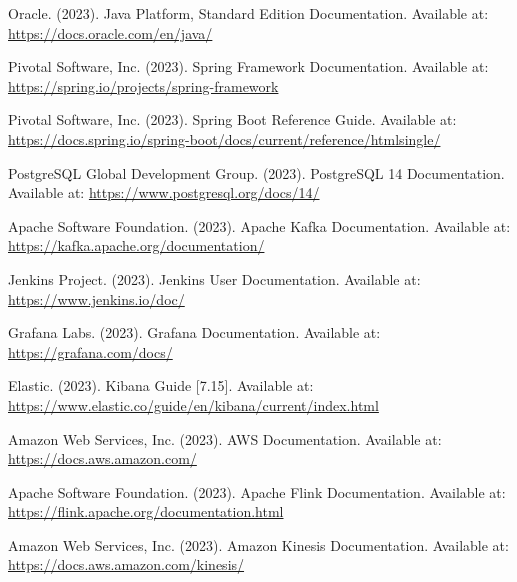 \documentclass[12pt,a4paper]{report}
\begin{document}
 
\begin{thebibliography}{9}
Oracle. (2023). Java Platform, Standard Edition Documentation. Available at: \url{https://docs.oracle.com/en/java/}

Pivotal Software, Inc. (2023). Spring Framework Documentation. Available at: \url{https://spring.io/projects/spring-framework}

Pivotal Software, Inc. (2023). Spring Boot Reference Guide. Available at: \url{https://docs.spring.io/spring-boot/docs/current/reference/htmlsingle/}

PostgreSQL Global Development Group. (2023). PostgreSQL 14 Documentation. Available at: \url{https://www.postgresql.org/docs/14/}

Apache Software Foundation. (2023). Apache Kafka Documentation. Available at: \url{https://kafka.apache.org/documentation/}

Jenkins Project. (2023). Jenkins User Documentation. Available at: \url{https://www.jenkins.io/doc/}

Grafana Labs. (2023). Grafana Documentation. Available at: \url{https://grafana.com/docs/}

Elastic. (2023). Kibana Guide [7.15]. Available at: \url{https://www.elastic.co/guide/en/kibana/current/index.html}

Amazon Web Services, Inc. (2023). AWS Documentation. Available at: \url{https://docs.aws.amazon.com/}

Apache Software Foundation. (2023). Apache Flink Documentation. Available at: \url{https://flink.apache.org/documentation.html}

Amazon Web Services, Inc. (2023). Amazon Kinesis Documentation. Available at: \url{https://docs.aws.amazon.com/kinesis/}

\end{thebibliography}
\end{document}
